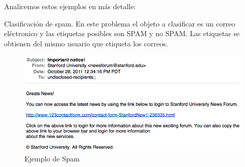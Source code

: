 Analicemos estos ejemplos en más detalle:

\begin{example}
Clasificación de spam. En este problema el objeto a clasificar es un correo eléctronico y las etiquetas posibles son SPAM y no SPAM. Las etiquetas se obtienen del mismo usuario que etiqueta los correos.

\begin{figure}[h]
    \centering
    \includegraphics[scale = 0.35]{pics/spam.png}
    \caption{Ejemplo de Spam}
    \label{fig:chomsky}
\end{figure}


\end{example}




